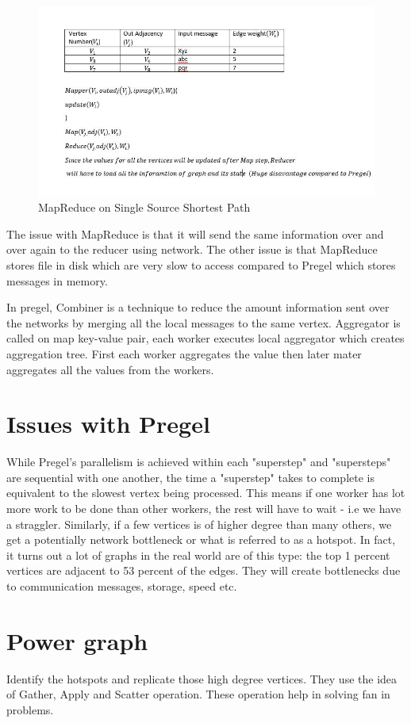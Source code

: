 \documentclass[twoside]{article}
\begin{document}
\begin{figure}[ht]
  \centering
  \includegraphics[width=0.7\linewidth]{MapReduce-on-SSSP.jpg}
  \caption{MapReduce on Single Source Shortest Path}
  \vspace{-0.2cm}
  \label{fig:blockdiagram}
  \vspace{-0.2cm}
\end{figure}

The issue with MapReduce is that it will send the same information over and over again to the reducer using network. The other issue is that MapReduce stores file in disk which are very slow to access compared to Pregel which stores messages in memory.

In pregel, Combiner is a technique to reduce the amount information sent over the networks by merging all the local messages to the same vertex. Aggregator is called on map key-value pair, each worker executes local aggregator which creates aggregation tree. First each worker aggregates the value then later mater aggregates all the values from the workers.

\section{Issues with Pregel}
While Pregel's parallelism is achieved within each "superstep" and "supersteps" are sequential with one another,
the time a "superstep" takes to complete is equivalent to the slowest vertex being processed. This means if one worker has lot more work to be done than other workers, the rest will have to wait - i.e we have a straggler. Similarly, if a few vertices is of higher degree than many others, we get a potentially network bottleneck or what is referred to as a hotspot. In fact, it turns out a lot of graphs in the real world are of this type:  the top 1 percent vertices are adjacent to 53 percent of the edges. They will create bottlenecks due to communication messages, storage, speed etc.

\section{Power graph}
Identify the hotspots and replicate those high degree vertices. They use the idea of Gather, Apply and Scatter operation. These operation help in solving fan in problems. 
\end{document}
